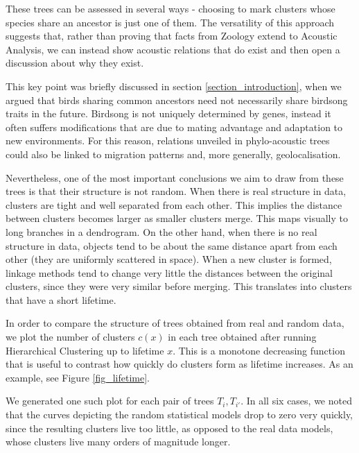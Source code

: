 \documentclass[pdftex,11pt,a4paper]{article}
\theoremstyle{definition}
\theoremstyle{remark}
\begin{document}
\par These trees can be assessed in several ways - choosing to mark clusters whose species share an ancestor is just one of them. The versatility of this approach suggests that, rather than proving that facts from Zoology extend to Acoustic Analysis, we can instead show acoustic relations that do exist and then open a discussion about why they exist.
\par This key point was briefly discussed in section \ref{section_introduction}, when we argued that birds sharing common ancestors need not necessarily share birdsong traits in the future. Birdsong is not uniquely determined by genes, instead it often suffers modifications that are due to mating advantage and adaptation to new environments. For this reason, relations unveiled in phylo-acoustic trees could also be linked to migration patterns and, more generally, geolocalisation.
\par Nevertheless, one of the most important conclusions we aim to draw from these trees is that their structure is not random. When there is real structure in data, clusters are tight and well separated from each other. This implies the distance between clusters becomes larger as smaller clusters merge. This maps visually to long branches in a dendrogram. On the other hand, when there is no real structure in data, objects tend to be about the same distance apart from each other (they are uniformly scattered in space). When a new cluster is formed, linkage methods tend to change very little the distances between the original clusters, since they were very similar before merging. This translates into clusters that have a short lifetime.
\par In order to compare the structure of trees obtained from real and random data, we plot the number of clusters $c(x)$ in each tree obtained after running Hierarchical Clustering up to lifetime $x$. This is a monotone decreasing function that is useful to contrast how quickly do clusters form as lifetime increases. As an example, see Figure \ref{fig_lifetime}.
\par We generated one such plot for each pair of trees $T_i, T_{i'}$. In all six cases, we noted that the curves depicting the random statistical models drop to zero very quickly, since the resulting clusters live too little, as opposed to the real data models, whose clusters live many orders of magnitude longer. 


\clearpage
\end{document}
